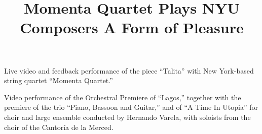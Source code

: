  \title{ Momenta Quartet Plays NYU Composers}
 \begin{position}
{ Live video and feedback performance of the piece ``Talita'' with New York-based string quartet ``Momenta Quartet.'' }
\end{position}
 

 \title{ A Form of Pleasure}
 \begin{position}
{ Video performance of the Orchestral Premiere of ``Lagos,'' together with the premiere of the trio ``Piano, Bassoon and Guitar,'' and of ``A Time In Utopia'' for choir and large ensemble conducted by Hernando Varela, with soloists from the choir of the Cantoría de la Merced. }
\end{position}

